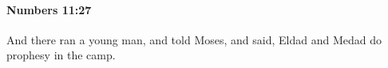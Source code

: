 
		\paragraph{Numbers 11:27} %
			\label{NUMBERS-11-27}

			And there ran a young man, and told Moses, and said, Eldad and Medad do prophesy in the camp.



